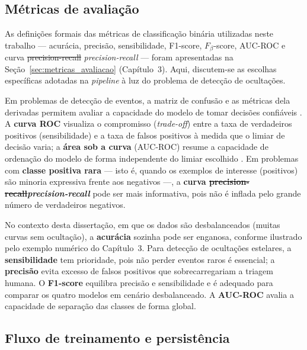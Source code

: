 \documentclass[msc]{on} %
\makeatletter
\providecommand{\DIFaddtex}[1]{{\protect\color{red}#1}} %
\providecommand{\DIFdeltex}[1]{{\protect\color{red}\sout{#1}}} %
\providecommand{\DIFaddbegin}{} %
\providecommand{\DIFaddend}{} %
\providecommand{\DIFdelbegin}{} %
\providecommand{\DIFdelend}{} %
\providecommand{\DIFadd}[1]{\texorpdfstring{\DIFaddtex{#1}}{#1}} %
\providecommand{\DIFdel}[1]{\texorpdfstring{\DIFdeltex{#1}}{}} %
\let\sout@orig\sout %
\renewcommand{\sout}[1]{\ifmmode\text{\sout@orig{\ensuremath{#1}}}\else\sout@orig{#1}\fi} %
\makeatother
\begin{document}
\subsection{Métricas de avaliação}

As definições formais das métricas de classificação binária utilizadas neste trabalho --- acurácia, precisão, sensibilidade, F1-score, $F_\beta$-score, AUC-ROC e curva \DIFdelbegin \DIFdel{precision-recall }\DIFdelend \DIFaddbegin \textit{\DIFadd{precision-recall}} \DIFaddend --- foram apresentadas na Seção~\ref{sec:metricas_avaliacao} (Capítulo~3). Aqui, discutem-se as escolhas específicas adotadas na \textit{pipeline} à luz do problema de detecção de ocultações.

Em problemas de detecção de eventos, a matriz de confusão e as métricas dela derivadas permitem avaliar a capacidade do modelo de tomar decisões confiáveis \citep{Cazeneuve2023}. A \textbf{curva ROC} visualiza o \DIFaddbegin \DIFadd{compromisso (}\DIFaddend \textit{trade-off}\DIFaddbegin \DIFadd{) }\DIFaddend entre a taxa de verdadeiros positivos (sensibilidade) e a taxa de falsos positivos à medida que o limiar de decisão varia; a \textbf{área sob a curva} (AUC-ROC) resume a capacidade de ordenação do modelo de forma independente do limiar escolhido \citep{AUC-curve}. Em problemas com \textbf{classe positiva rara} --- isto é, quando os exemplos de interesse (positivos) são minoria expressiva frente aos negativos ---, a \textbf{curva \DIFdelbegin \DIFdel{precision-recall}\DIFdelend \DIFaddbegin \textit{\DIFadd{precision-recall}}\DIFaddend } pode ser mais informativa, pois não é inflada pelo grande número de verdadeiros negativos.

No contexto desta dissertação, em que os dados são desbalanceados (muitas curvas sem ocultação), a \textbf{acurácia} sozinha pode ser enganosa, conforme ilustrado pelo exemplo numérico do Capítulo~3. Para detecção de ocultações estelares, a \textbf{sensibilidade} tem prioridade, pois não perder eventos raros é essencial; a \textbf{precisão} evita excesso de falsos positivos que sobrecarregariam a triagem humana. O \textbf{F1-score} equilibra precisão e sensibilidade e é adequado para comparar os quatro modelos em cenário desbalanceado. A \textbf{AUC-ROC} avalia a capacidade de separação das classes de forma global.

\subsection{Fluxo de treinamento e persistência}
\end{document}
